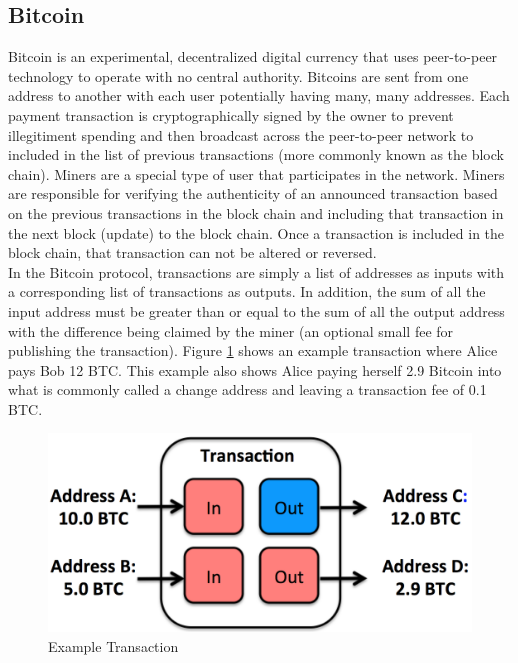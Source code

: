 \documentclass[10pt, letterpaper, twocolumn, twoside]{article}
\begin{document}
\subsection{Bitcoin}
Bitcoin is an experimental, decentralized digital currency that uses peer-to-peer technology to operate with no central authority. Bitcoins are sent from one address to another with each user potentially having many, many addresses. Each payment transaction is cryptographically signed by the owner to prevent illegitiment spending and then broadcast across the peer-to-peer network to included in the list of previous transactions (more commonly known as the block chain). Miners are a special type of user that participates in the network. Miners are responsible for verifying the authenticity of an announced transaction based on the previous transactions in the block chain and including that transaction in the next block (update) to the block chain. Once a transaction is included in the block chain, that transaction can not be altered or reversed.\\

In the Bitcoin protocol, transactions are simply a list of addresses as inputs with a corresponding list of transactions as outputs. In addition, the sum of all the input address must be greater than or equal to the sum of all the output address with the difference being claimed by the miner (an optional small fee for publishing the transaction).  Figure \ref{fig:transaction} shows an example transaction where Alice pays Bob 12 BTC. This example also shows Alice paying herself 2.9 Bitcoin into what is commonly called a change address and leaving a transaction fee of 0.1 BTC.

\begin{figure}
  \includegraphics[width=\linewidth]{transaction2.png}
  \caption{Example Transaction}
  \label{fig:transaction}
\end{figure}
\end{document}
